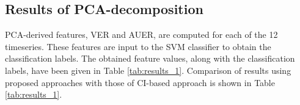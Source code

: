 \documentclass[journal]{IEEEtran}
\begin{document}
	

	
	\subsection{Results of PCA-decomposition}
	
	
	
	
	PCA-derived features, VER and AUER, are computed for each of the 12 timeseries. These features are input to the SVM classifier to obtain the classification labels. The obtained feature values, along with the classification labels, have been given in Table \ref{tab:results_1}.
	Comparison of results using proposed approaches with those of CI-based approach \cite{Adegoke2018} is shown in Table \ref{tab:results_1}.

	
	
\end{document}
